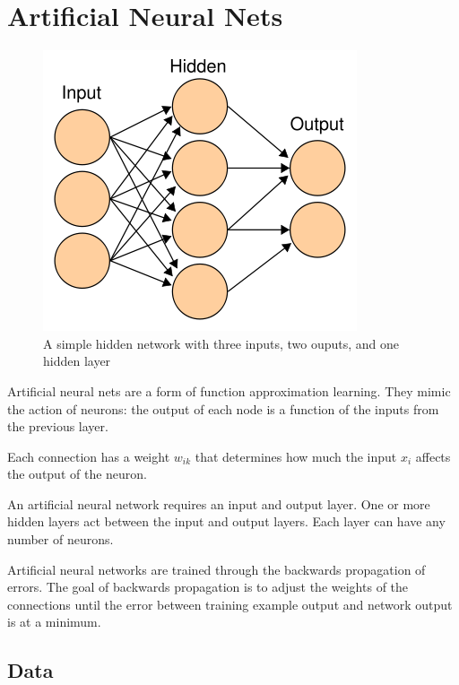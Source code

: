 \documentclass[11pt,a4paper]{article}
\begin{document}
\section{Artificial Neural Nets}
\label{Artificial Neural Nets}

\begin{figure}
  \begin{center}
	\includegraphics[scale=0.4]{neural_network.jpg}
  \end{center}
  \caption{A simple hidden network with three inputs, two ouputs, and one hidden layer}
\end{figure}

Artificial neural nets are a form of function approximation learning. They mimic the action of neurons: the output of each node is a function of the inputs from the previous layer. 

Each connection has a weight $w_{ik}$ that determines how much the input $x_i$ affects the output of the neuron.

An artificial neural network requires an input and output layer. One or more hidden layers act between the input and output layers. Each layer can have any number of neurons. 

Artificial neural networks are trained through the backwards propagation of errors. The goal of backwards propagation is to adjust the weights of the connections until the error between training example output and network output is at a minimum.

\subsection{Data}
\label{Artificial Neural Nets:Data}
\end{document}

